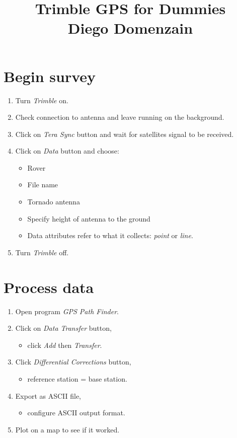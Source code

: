 \documentclass[a4paper,12pt]{article}
\title{Trimble GPS for Dummies\\{\normalsize Diego Domenzain}}
\author{}
\date{}
\begin{document}
\maketitle
\section*{Begin survey}
\begin{enumerate}
\item Turn {\it Trimble} on.
\item Check connection to antenna and leave running on the background.
\item Click on {\it Tera Sync} button and wait for satellites signal to be received.
\item Click on {\it Data} button and choose:
\begin{itemize}
\item Rover
\item File name
\item Tornado antenna
\item Specify height of antenna to the ground
\item Data attributes refer to what it collects: {\it point} or {\it line}.
\end{itemize}
\item Turn {\it Trimble} off.
\end{enumerate}
\section*{Process data}
\begin{enumerate}
\item Open program {\it GPS Path Finder}.
\item Click on {\it Data Transfer} button,
\begin{itemize}
\item click {\it Add} then {\it Transfer}.
\end{itemize}
\item Click {\it Differential Corrections} button,
\begin{itemize}
\item reference station = base station.
\end{itemize}
\item Export as ASCII file,
\begin{itemize}
\item configure ASCII output format.
\end{itemize}
\item Plot on a map to see if it worked.
\end{enumerate}
%
%
%


\end{document}
